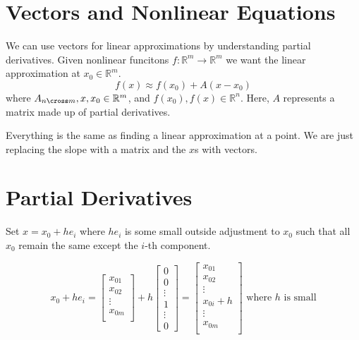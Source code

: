 \section{Vectors and Nonlinear Equations}

We can use vectors for linear approximations by understanding partial derivatives. Given nonlinear funcitons \(f: \mathbb{R}^m \to \mathbb{R}^m \) we want the linear approximation at \(x_0 \in \mathbb{R}^m \).
\[
  f(x) \approx f(x_0) + A(x - x_0)
\]
where \(A_{n \cross m}, x, x_0 \in \mathbb{R}^m\), and \(f(x_0), f(x) \in \mathbb{R}^n \). Here, \(A\) represents a matrix made up of partial derivatives.

\begin{remark}
  Everything is the same as finding a linear approximation at a point. We are just replacing the slope with a matrix and the \(x\)s with vectors.
\end{remark}

\section{Partial Derivatives}

Set \(x = x_0 + he_i\) where \(he_i\) is some small outside adjustment to \(x_0\) such that all \(x_0\) remain the same except the \(i\)-th component.

\[
  x_0 + he_i =
    \begin{bmatrix}
      x_{01} \\
      x_{02} \\
      \vdots \\
      x_{0m} \\
    \end{bmatrix} + h
    \begin{bmatrix}
      0 \\
      0 \\
      \vdots \\
      1 \\
      \vdots \\
      0
    \end{bmatrix} =
    \begin{bmatrix}
      x_{01} \\
      x_{02} \\
      \vdots \\
      x_{0i} + h \\
      \vdots \\
      x_{0m} \\
    \end{bmatrix}
    \text{    where \(h\) is small}
\]

